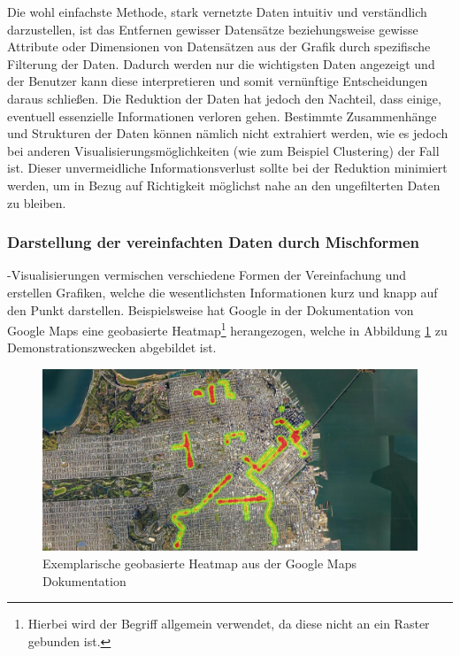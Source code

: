 Die wohl einfachste Methode, stark vernetzte Daten intuitiv und verständlich darzustellen, ist das Entfernen gewisser Datensätze beziehungsweise gewisse Attribute oder Dimensionen von Datensätzen aus der Grafik durch spezifische Filterung der Daten. Dadurch werden nur die wichtigsten Daten angezeigt und der Benutzer kann diese interpretieren und somit vernünftige Entscheidungen daraus schließen. Die Reduktion der Daten hat jedoch den Nachteil, dass einige, eventuell essenzielle Informationen verloren gehen. Bestimmte Zusammenhänge und Strukturen der Daten können nämlich nicht extrahiert werden, wie es jedoch bei anderen Visualisierungsmöglichkeiten (wie zum Beispiel Clustering) der Fall ist. Dieser unvermeidliche Informationsverlust sollte bei der Reduktion minimiert werden, um in Bezug auf Richtigkeit möglichst nahe an den ungefilterten Daten zu bleiben. \cite{heins2017herausforderungen,beilhammer2017interpretation}

\subsubsection{Darstellung der vereinfachten Daten durch Mischformen}

-Visualisierungen vermischen verschiedene Formen der Vereinfachung und erstellen Grafiken, welche die wesentlichsten Informationen kurz und knapp auf den Punkt darstellen. Beispielsweise hat Google in der Dokumentation von Google Maps eine geobasierte Heatmap\footnote{Hierbei wird der Begriff  allgemein verwendet, da diese nicht an ein Raster gebunden ist.} herangezogen, welche in Abbildung \ref{fig:GoogleMapsHeatmap} zu Demonstrationszwecken abgebildet ist.

\begin{figure}
    \centering
    \includegraphics[width=1\textwidth]{content/img/Research/Visualisation/Google_Maps_Heatmap.png}
    \caption{Exemplarische geobasierte Heatmap aus der Google Maps Dokumentation}
    \label{fig:GoogleMapsHeatmap}
\end{figure}
\FloatBarrier